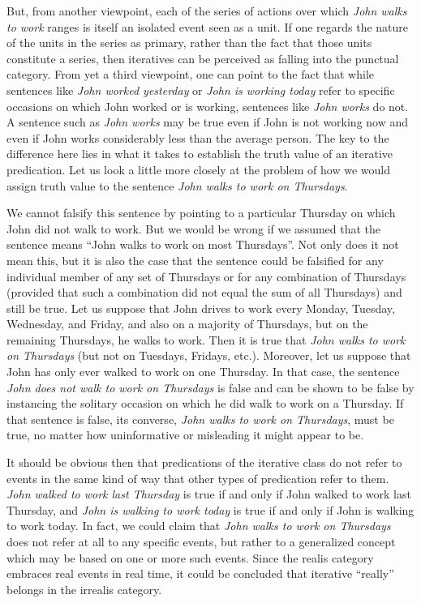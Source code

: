 But, from another viewpoint, each of the series of actions over which \textit{John walks to work} ranges is itself an isolated event seen as a unit. If one regards the nature of the units in the series as primary, rather than the fact that those units constitute a series, then iteratives can be perceived as falling into the punctual category.
From yet a third viewpoint, one can point to the fact that while sentences like \textit{John worked yesterday} or \textit{John is working today} refer to specific occasions on which John worked or is working, sentences like \textit{John works} do not. A sentence such as \textit{John works} may be true even if John is not working now and even if John works considerably less than the average person. The key to the difference here lies in what it takes to establish the truth value of an iterative predication. Let us look a little more closely at the problem of how we would assign truth value to the sentence \textit{John walks to work on Thursdays}. 

We cannot falsify this sentence by pointing to a particular Thursday on which John did not walk to work. But we would be wrong if we assumed that the sentence means ``John walks to work on most Thursdays''. Not only does it not mean this, but it is also the case that the sentence could be falsified for any individual member of any set of Thursdays or for any combination of Thursdays (provided that such a combination did not equal the sum of all Thursdays) and still be true. Let us suppose that John drives to work every Monday, Tuesday, Wednesday, and Friday, and also on a majority of Thursdays, but on the remaining Thursdays, he walks to work. Then it is true that \textit{John walks to work on Thursdays} (but not on Tuesdays, Fridays, etc.). Moreover, let us suppose that John has only ever walked to work on one Thursday. In that case, the sentence \textit{John does not walk to work on Thursdays} is false and can be shown to be false by instancing the solitary occasion on which he did walk to work on a Thursday. If that sentence is false, its converse, \textit{John walks to work on Thursdays}, must be true, no matter how uninformative or misleading it might appear to be. 

It should be obvious then that predications of the iterative class do not refer to events in the same kind of way that other types of predication refer to them. \textit{John walked to work last Thursday} is true if and only if John walked to work last Thursday, and \textit{John is walking to work today} is true if and only if John is walking to work today. In fact, we could claim that \textit{John walks to work on Thursdays} does not refer at all to any specific events, but rather to a generalized concept which may be based on one or more such events. Since the realis category embraces real events in real time, it could be concluded that iterative ``really'' belongs in the irrealis category.

